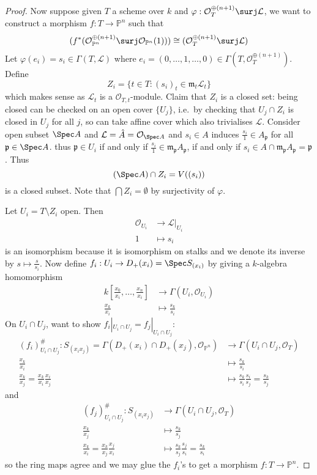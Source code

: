 \documentclass[a4paper]{article}
\renewcommand*{\P}{\mathbb{P}}
\newcommand{\sh}[1]{\mathcal{#1}} %
\begin{document}
\begin{proof}
  Now suppose given \(T\) a scheme over \(k\) and \(\varphi: \sh O_T^{\oplus(n + 1)} \surj \sh L\), we want to construct a morphism \(f: T \to \P^n\) such that
  \[
    (f^*(\sh O_{\P^n}^{\oplus(n + 1)} \surj \sh O_{\P^n}(1))) \cong (\sh O_T^{\oplus(n + 1)} \surj \sh L)
  \]
  Let \(\varphi(e_i) = s_i \in \Gamma(T, \sh L)\) where \(e_i = (0, \dots, 1, \dots, 0) \in \Gamma(T, \sh O_T^{\oplus(n + 1)})\). Define
  \[
    Z_i = \{t \in T: (s_i)_t \in \mathfrak m_t \sh L_t\}
  \]
  which makes sense as \(\sh L_t\) is a \(\sh O_{T, t}\)-module. Claim that \(Z_i\) is a closed set: being closed can be checked on an open cover \(\{U_j\}\), i.e.\ by checking that \(U_j \cap Z_i\) is closed in \(U_j\) for all \(j\), so can take affine cover which also trivialises \(\sh L\). Consider open subset \(\Spec A\) and \(\sh L = \hat A = \sh O_{\Spec A}\) and \(s_i \in A\) induces \(\frac{s_i}{1} \in A_{\mathfrak p}\) for all \(\mathfrak p \in \Spec A\). thus \(\mathfrak p \in U_i\) if and only if \(\frac{s_i}{1} \in \mathfrak m_{\mathfrak p} A_{\mathfrak p}\), if and only if \(s_i \in A \cap \mathfrak m_{\mathfrak p} A_{\mathfrak p} = \mathfrak p\). Thus
  \[
    (\Spec A) \cap Z_i = V((s_i))
  \]
  is a closed subset. Note that \(\bigcap Z_i = \emptyset\) by surjectivity of \(\varphi\).

  Let \(U_i = T\setminus Z_i\) open. Then
  \begin{align*}
    \sh O_{U_i} &\to \sh L|_{U_i} \\
    1 &\mapsto s_i
  \end{align*}
  is an isomorphism because it is isomorphism on stalks and we denote its inverse by \(s \mapsto \frac{s}{s_i}\). Now define \(f_i: U_i \to D_+(x_i) = \Spec S_{(x_i)}\) by giving a \(k\)-algebra homomorphism
  \begin{align*}
    k[\frac{x_0}{x_i}, \dots, \frac{x_n}{x_i}] &\to \Gamma(U_i, \sh O_{U_i}) \\
    \frac{x_k}{x_i} &\mapsto \frac{s_k}{s_i}
  \end{align*}
  On \(U_i \cap U_j\), want to show \(f_i|_{U_i \cap U_j} = f_j|_{U_i \cap U_j}\):
  \begin{align*}
    (f_i)_{U_i \cap U_j}^\#: S_{(x_i x_j)} = \Gamma(D_+(x_i) \cap D_+(x_j), \sh O_{\P^n}) &\to \Gamma(U_i \cap U_j, \sh O_T) \\
    \frac{x_k}{x_i} &\mapsto \frac{s_k}{s_i} \\
    \frac{x_k}{x_j} = \frac{x_k}{x_i} \frac{x_i}{x_j} &\mapsto \frac{s_k}{s_i} \frac{s_i}{s_j} = \frac{s_k}{s_j}
  \end{align*}
  and
  \begin{align*}
    (f_j)_{U_i \cap U_j}^\#: S_{(x_i x_j)} &\to \Gamma(U_i \cap U_j, \sh O_T) \\
    \frac{x_k}{x_j} &\mapsto \frac{s_k}{s_j} \\
    \frac{x_k}{x_i} = \frac{x_k}{x_j} \frac{x_j}{x_i} &\mapsto \frac{s_k}{s_j} \frac{s_j}{s_i} = \frac{s_k}{s_i}
  \end{align*}
  so the ring maps agree and we may glue the \(f_i\)'s to get a morphism \(f: T \to \P^n\).


\end{proof}
\end{document}
